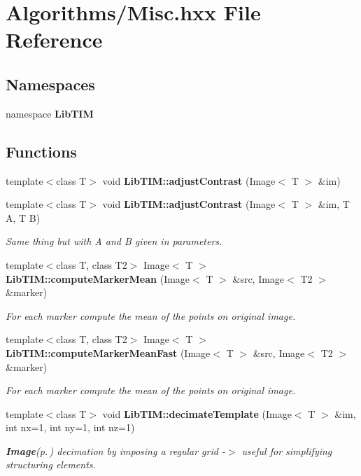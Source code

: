 \section{Algorithms/Misc.hxx File Reference}
\label{Misc_8hxx}
\subsection*{Namespaces}
\begin{CompactItemize}
\item 
namespace {\bf Lib\-TIM}
\end{CompactItemize}
\subsection*{Functions}
\begin{CompactItemize}
\item 
template$<$class T$>$ void {\bf Lib\-TIM::adjust\-Contrast} (Image$<$ T $>$ \&im)
\item 
template$<$class T$>$ void {\bf Lib\-TIM::adjust\-Contrast} (Image$<$ T $>$ \&im, T A, T B)
\begin{CompactList}\small\item\em Same thing but with A and B given in parameters. \item\end{CompactList}\item 
template$<$class T, class T2$>$ Image$<$ T $>$ {\bf Lib\-TIM::compute\-Marker\-Mean} (Image$<$ T $>$ \&src, Image$<$ T2 $>$ \&marker)
\begin{CompactList}\small\item\em For each marker compute the mean of the points on original image. \item\end{CompactList}\item 
template$<$class T, class T2$>$ Image$<$ T $>$ {\bf Lib\-TIM::compute\-Marker\-Mean\-Fast} (Image$<$ T $>$ \&src, Image$<$ T2 $>$ \&marker)
\begin{CompactList}\small\item\em For each marker compute the mean of the points on original image. \item\end{CompactList}\item 
template$<$class T$>$ void {\bf Lib\-TIM::decimate\-Template} (Image$<$ T $>$ \&im, int nx=1, int ny=1, int nz=1)
\begin{CompactList}\small\item\em {\bf Image}{\rm (p.\,\pageref{classLibTIM_1_1Image})} decimation by imposing a regular grid -$>$ useful for simplifying structuring elements. \item\end{CompactList}\item 

\end{CompactItemize}
